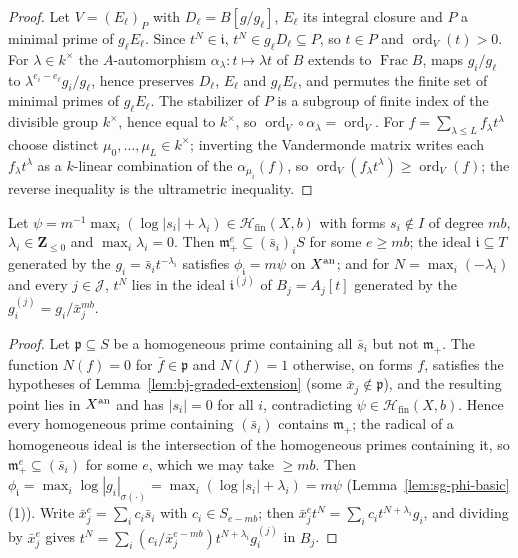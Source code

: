 \begin{proof}
Let $V=(E_\ell)_P$ with $D_\ell=B[g/g_\ell]$, $E_\ell$ its integral closure and $P$ a minimal prime of $g_\ell E_\ell$. Since $t^N\in\mathfrak i$,
$t^N\in g_\ell D_\ell\subseteq P$, so $t\in P$ and $\operatorname{ord}_V(t)>0$. For $\lambda\in k^\times$ the $A$-automorphism $\alpha_\lambda\colon t\mapsto\lambda t$ of
$B$ extends to $\operatorname{Frac}B$, maps $g_i/g_\ell$ to $\lambda^{e_i-e_\ell}g_i/g_\ell$, hence preserves $D_\ell$, $E_\ell$ and $g_\ell E_\ell$, and permutes the
finite set of minimal primes of $g_\ell E_\ell$. The stabilizer of $P$ is a subgroup of finite index of the divisible group
$k^\times$, hence equal to $k^\times$, so $\operatorname{ord}_V\circ\alpha_\lambda=\operatorname{ord}_V$. For $f=\sum_{\lambda\le L}f_\lambda t^\lambda$ choose distinct
$\mu_0,\dots,\mu_L\in k^\times$; inverting the Vandermonde matrix writes each $f_\lambda t^\lambda$ as a $k$-linear combination of the
$\alpha_{\mu_i}(f)$, so $\operatorname{ord}_V(f_\lambda t^\lambda)\ge\operatorname{ord}_V(f)$; the reverse inequality is the ultrametric inequality.
\end{proof}

\begin{lemma}\label{lem:sg-finite-fs}
\leanok
{}
Let $\psi=m^{-1}\max_i(\log|s_i|+\lambda_i)\in\mathcal H_{\mathrm{fin}}(X,b)$ with forms $s_i\notin I$ of degree $mb$, $\lambda_i\in\mathbf{Z}_{\le0}$ and
$\max_i\lambda_i=0$. Then $\mathfrak m_+^e\subseteq(\bar s_i)_iS$ for some $e\ge mb$; the ideal $\mathfrak i\subseteq T$ generated by the
$g_i=\bar s_it^{-\lambda_i}$ satisfies $\phi_{\mathfrak i}=m\psi$ on $X^{\mathrm{an}}$; and for $N=\max_i(-\lambda_i)$ and every $j\in\mathcal J$,
$t^N$ lies in the ideal $\mathfrak i^{(j)}$ of $B_j=A_j[t]$ generated by the $g_i^{(j)}=g_i/\bar x_j^{mb}$.
\end{lemma}

\begin{proof}
Let $\mathfrak p\subseteq S$ be a homogeneous prime containing all $\bar s_i$ but not $\mathfrak m_+$. The function $N(f)=0$ for $\bar f\in\mathfrak p$ and
$N(f)=1$ otherwise, on forms $f$, satisfies the hypotheses of Lemma~\ref{lem:bj-graded-extension} (some $\bar x_j\notin\mathfrak p$), and the
resulting point lies in $X^{\mathrm{an}}$ and has $|s_i|=0$ for all $i$, contradicting $\psi\in\mathcal H_{\mathrm{fin}}(X,b)$. Hence every homogeneous
prime containing $(\bar s_i)$ contains $\mathfrak m_+$; the radical of a homogeneous ideal is the intersection of the homogeneous primes
containing it, so $\mathfrak m_+^e\subseteq(\bar s_i)$ for some $e$, which we may take $\ge mb$. Then
$\phi_{\mathfrak i}=\max_i\log|g_i|_{\sigma(\cdot)}=\max_i(\log|s_i|+\lambda_i)=m\psi$ (Lemma~\ref{lem:sg-phi-basic}(1)). Write
$\bar x_j^e=\sum_ic_i\bar s_i$ with $c_i\in S_{e-mb}$; then $\bar x_j^et^N=\sum_ic_it^{N+\lambda_i}g_i$, and dividing by $\bar x_j^e$ gives
$t^N=\sum_i(c_i/\bar x_j^{e-mb})t^{N+\lambda_i}g_i^{(j)}$ in $B_j$.
\end{proof}

